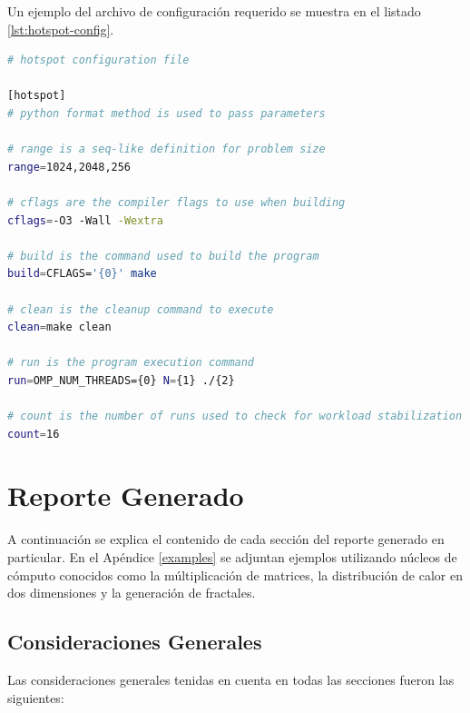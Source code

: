 \documentclass[a4paper]{report}
\begin{document}
\bigskip

Un ejemplo del archivo de configuración requerido se muestra en el listado \ref{lst:hotspot-config}.

\begin{lstlisting}[language=bash, caption={Configuración de {\tt hotspot}}, label={lst:hotspot-config}]
# hotspot configuration file

[hotspot]
# python format method is used to pass parameters

# range is a seq-like definition for problem size
range=1024,2048,256

# cflags are the compiler flags to use when building
cflags=-O3 -Wall -Wextra

# build is the command used to build the program
build=CFLAGS='{0}' make

# clean is the cleanup command to execute
clean=make clean

# run is the program execution command
run=OMP_NUM_THREADS={0} N={1} ./{2}

# count is the number of runs used to check for workload stabilization
count=16
\end{lstlisting}

\section{Reporte Generado}

A continuación se explica el contenido de cada sección del reporte generado en particular.
En el Apéndice \ref{examples} se adjuntan ejemplos utilizando núcleos de cómputo conocidos como la múltiplicación de matrices, 
la distribución de calor en dos dimensiones y la generación de fractales.

\subsection{Consideraciones Generales}

Las consideraciones generales tenidas en cuenta en todas las secciones fueron las siguientes:
\end{document}
